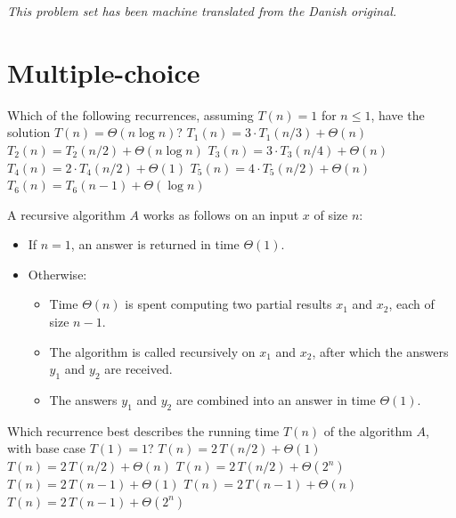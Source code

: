 \noindent\emph{This problem set has been machine translated from the Danish original.}
\medskip

\section*{Multiple-choice}\label{sec:mc}


\multiplechoicestart

Which of the following recurrences, assuming $T(n)=1$ for $n\leq 1$, have the solution $T(n)=\Theta(n \log n)$? \multipleanswers
\optionsstart
\answer $T_1(n) = 3\cdot T_1(n/3) + \Theta(n)$ \correct
\answer $T_2(n) = T_2(n/2) + \Theta(n \log n)$ \correct
\answer $T_3(n) = 3\cdot T_3(n/4) + \Theta(n)$
\answer $T_4(n) = 2\cdot T_4(n/2) + \Theta(1)$
\answer $T_5(n) = 4\cdot T_5(n/2) + \Theta(n)$
\answer $T_6(n) = T_6(n-1) + \Theta(\log n)$ \correct
\optionsend
{}

A recursive algorithm \(A\) works as follows on an input \(x\) of size \(n\):
\begin{itemize}
  \item If \(n=1\), an answer is returned in time \(\Theta(1)\).
  \item Otherwise:
  \begin{itemize}
    \item Time \(\Theta(n)\) is spent computing two partial results \(x_1\) and \(x_2\), each of size \(n-1\).
    \item The algorithm is called recursively on \(x_1\) and \(x_2\), after which the answers \(y_1\) and \(y_2\) are received.
    \item The answers \(y_1\) and \(y_2\) are combined into an answer in time \(\Theta(1)\).
  \end{itemize}
\end{itemize}
Which recurrence best describes the running time \(T(n)\) of the algorithm \(A\), with base case \(T(1)=1\)?
\oneanswer
\optionsstart
\answer \(T(n)=2\,T(n/2)+\Theta(1)\)
\answer \(T(n)=2\,T(n/2)+\Theta(n)\)
\answer \(T(n)=2\,T(n/2)+\Theta(2^n)\)
\answer \(T(n)=2\,T(n-1)+\Theta(1)\)
\answer \(T(n)=2\,T(n-1)+\Theta(n)\) \correct
\answer \(T(n)=2\,T(n-1)+\Theta(2^n)\)
\optionsend
{}

